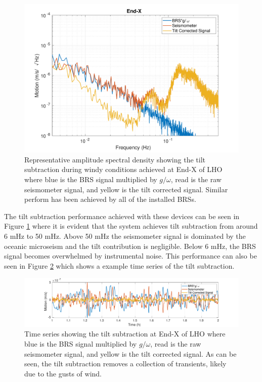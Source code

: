 \documentclass [12pt, proquest]{uwthesis}[2019]
\begin{document}
\begin{figure}%
\begin{center}
\includegraphics[width=\textwidth]{HSubtractionETMX.pdf}
\caption{Representative amplitude spectral density showing the tilt subtraction during windy conditions achieved at End-X of LHO where blue is the BRS signal multiplied by $g/\omega$, read is the raw seismometer signal, and yellow is the tilt corrected signal. Similar perform has been achieved by all of the installed BRSs.}
\label{sub}
\end{center}
\end{figure}

The tilt subtraction performance achieved with these devices can be seen in Figure \ref{sub} where it is evident that the system achieves tilt subtraction from around 6 mHz to 50 mHz. Above 50 mHz the seismometer signal is dominated by the oceanic microseism and the tilt contribution is negligible. Below 6 mHz, the BRS signal becomes overwhelmed by instrumental noise. This performance can also be seen in Figure \ref{subTime} which shows a example time series of the tilt subtraction. 

\begin{figure}%
\begin{center}
\includegraphics[width=\textwidth]{TiltCorrTime.pdf}
\caption{Time series showing the tilt subtraction at End-X of LHO where blue is the BRS signal multiplied by $g/\omega$, read is the raw seismometer signal, and yellow is the tilt corrected signal. As can be seen, the tilt subtraction removes a collection of transients, likely due to the gusts of wind.}
\label{subTime}
\end{center}
\end{figure}
\end{document}
